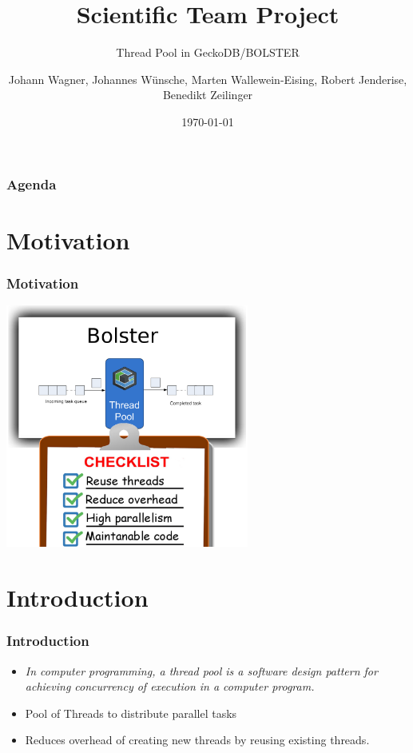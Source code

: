 \documentclass{beamer}
\title{Scientific Team Project}
\subtitle{Thread Pool in GeckoDB/BOLSTER}
\author{Johann Wagner, Johannes Wünsche, Marten Wallewein-Eising, Robert Jenderise, Benedikt Zeilinger}
\date{\today}
\institute{Otto von Guericke University, Magdeburg}
\begin{document}
\begin{frame}[plain]
 \titlepage
\end{frame}

\section[Agenda]{}
	\begin{frame}
	\frametitle{Agenda}
	\tableofcontents
	\end{frame}

\section{Motivation}
	\begin{frame}
		\frametitle{Motivation}
		\begin{center}
			\includegraphics[width=0.6\textwidth]{img/bigpicture.png}
		\end{center}
	\end{frame}

\section{Introduction}
	\begin{frame}
		\frametitle{Introduction}
		\begin{itemize}
			\item \emph{In computer programming, a thread pool is a software design pattern for achieving concurrency of execution in a computer program.}
			\item Pool of Threads to distribute parallel tasks
			\item Reduces overhead of creating new threads by reusing existing threads.
		\end{itemize}
	\end{frame}
	
\end{document}
